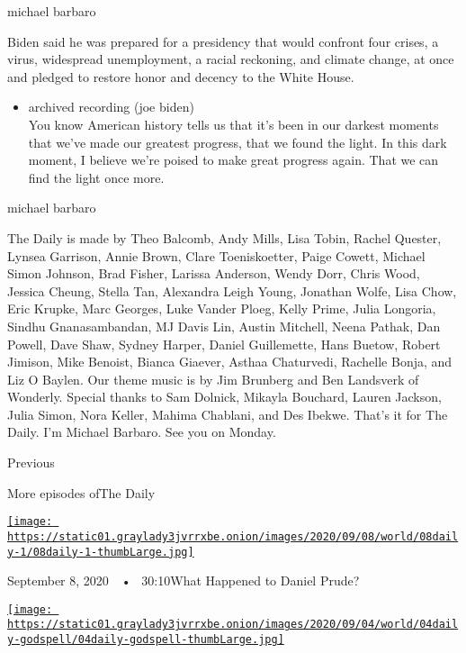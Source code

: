 michael barbaro

Biden said he was prepared for a presidency that would confront four
crises, a virus, widespread unemployment, a racial reckoning, and
climate change, at once and pledged to restore honor and decency to the
White House.

\begin{itemize}
\tightlist
\item
  archived recording (joe biden)\\
  You know American history tells us that it's been in our darkest
  moments that we've made our greatest progress, that we found the
  light. In this dark moment, I believe we're poised to make great
  progress again. That we can find the light once more.
\end{itemize}

michael barbaro

The Daily is made by Theo Balcomb, Andy Mills, Lisa Tobin, Rachel
Quester, Lynsea Garrison, Annie Brown, Clare Toeniskoetter, Paige
Cowett, Michael Simon Johnson, Brad Fisher, Larissa Anderson, Wendy
Dorr, Chris Wood, Jessica Cheung, Stella Tan, Alexandra Leigh Young,
Jonathan Wolfe, Lisa Chow, Eric Krupke, Marc Georges, Luke Vander Ploeg,
Kelly Prime, Julia Longoria, Sindhu Gnanasambandan, MJ Davis Lin, Austin
Mitchell, Neena Pathak, Dan Powell, Dave Shaw, Sydney Harper, Daniel
Guillemette, Hans Buetow, Robert Jimison, Mike Benoist, Bianca Giaever,
Asthaa Chaturvedi, Rachelle Bonja, and Liz O Baylen. Our theme music is
by Jim Brunberg and Ben Landsverk of Wonderly. Special thanks to Sam
Dolnick, Mikayla Bouchard, Lauren Jackson, Julia Simon, Nora Keller,
Mahima Chablani, and Des Ibekwe. That's it for The Daily. I'm Michael
Barbaro. See you on Monday.

Previous

More episodes ofThe Daily

\href{https://www.nytimes3xbfgragh.onion/2020/09/08/podcasts/the-daily/Daniel-Prude-BLM-police.html?action=click\&module=audio-series-bar\&region=header\&pgtype=Article}{\texttt{[image: https://static01.graylady3jvrrxbe.onion/images/2020/09/08/world/08daily-1/08daily-1-thumbLarge.jpg]}}

September 8, 2020~~•~ 30:10What Happened to Daniel Prude?

\href{https://www.nytimes3xbfgragh.onion/2020/09/04/podcasts/the-daily/Godspell-theater-coronavirus.html?action=click\&module=audio-series-bar\&region=header\&pgtype=Article}{\texttt{[image: https://static01.graylady3jvrrxbe.onion/images/2020/09/04/world/04daily-godspell/04daily-godspell-thumbLarge.jpg]}}

